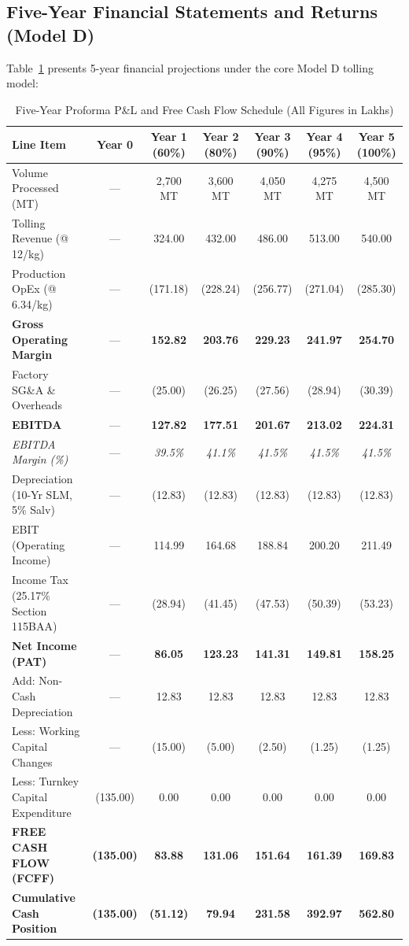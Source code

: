 \documentclass[10pt,a4paper]{article}
\newcommand{\inr}{\text{INR~}}
\begin{document}
\subsection{Five-Year Financial Statements and Returns (Model D)}
Table~\ref{tab:cash_flows} presents 5-year financial projections under the core Model D tolling model:

\begin{table}[H]
\centering
\small
\caption{Five-Year Proforma P\&L and Free Cash Flow Schedule (All Figures in \inr Lakhs)}
\label{tab:cash_flows}
\begin{tabularx}{\linewidth}{Xcccccc}
\toprule
\textbf{Line Item} & \textbf{Year 0} & \textbf{Year 1 (60\%)} & \textbf{Year 2 (80\%)} & \textbf{Year 3 (90\%)} & \textbf{Year 4 (95\%)} & \textbf{Year 5 (100\%)} \\
\midrule
Volume Processed (MT) & --- & 2,700 MT & 3,600 MT & 4,050 MT & 4,275 MT & 4,500 MT \\
Tolling Revenue (@ \inr 12/kg) & --- & 324.00 & 432.00 & 486.00 & 513.00 & 540.00 \\
Production OpEx (@ \inr 6.34/kg) & --- & (171.18) & (228.24) & (256.77) & (271.04) & (285.30) \\
\textbf{Gross Operating Margin} & --- & \textbf{152.82} & \textbf{203.76} & \textbf{229.23} & \textbf{241.97} & \textbf{254.70} \\
Factory SG\&A \& Overheads & --- & (25.00) & (26.25) & (27.56) & (28.94) & (30.39) \\
\textbf{EBITDA} & --- & \textbf{127.82} & \textbf{177.51} & \textbf{201.67} & \textbf{213.02} & \textbf{224.31} \\
\textit{EBITDA Margin (\%)} & --- & \textit{39.5\%} & \textit{41.1\%} & \textit{41.5\%} & \textit{41.5\%} & \textit{41.5\%} \\
Depreciation (10-Yr SLM, 5\% Salv) & --- & (12.83) & (12.83) & (12.83) & (12.83) & (12.83) \\
EBIT (Operating Income) & --- & 114.99 & 164.68 & 188.84 & 200.20 & 211.49 \\
Income Tax (25.17\% Section 115BAA) & --- & (28.94) & (41.45) & (47.53) & (50.39) & (53.23) \\
\textbf{Net Income (PAT)} & --- & \textbf{86.05} & \textbf{123.23} & \textbf{141.31} & \textbf{149.81} & \textbf{158.25} \\
Add: Non-Cash Depreciation & --- & 12.83 & 12.83 & 12.83 & 12.83 & 12.83 \\
Less: Working Capital Changes & --- & (15.00) & (5.00) & (2.50) & (1.25) & (1.25) \\
Less: Turnkey Capital Expenditure & (135.00) & 0.00 & 0.00 & 0.00 & 0.00 & 0.00 \\
\midrule
\textbf{FREE CASH FLOW (FCFF)} & \textbf{(135.00)} & \textbf{83.88} & \textbf{131.06} & \textbf{151.64} & \textbf{161.39} & \textbf{169.83} \\
\textbf{Cumulative Cash Position} & \textbf{(135.00)} & \textbf{(51.12)} & \textbf{79.94} & \textbf{231.58} & \textbf{392.97} & \textbf{562.80} \\
\bottomrule
\end{tabularx}
\end{table}
\end{document}
